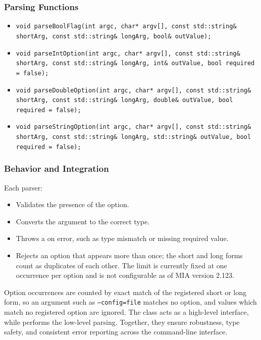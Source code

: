 \subsubsection{Parsing Functions}
\begin{itemize}\itemsep0em
	\item \texttt{void parseBoolFlag(int argc, char* argv[], const std::string\& shortArg, const std::string\& longArg, bool\& outValue);}
	\item \texttt{void parseIntOption(int argc, char* argv[], const std::string\& shortArg, const std::string\& longArg, int\& outValue, bool required = false);}
	\item \texttt{void parseDoubleOption(int argc, char* argv[], const std::string\& shortArg, const std::string\& longArg, double\& outValue, bool required = false);}
	\item \texttt{void parseStringOption(int argc, char* argv[], const std::string\& shortArg, const std::string\& longArg, std::string\& outValue, bool required = false);}
\end{itemize}

\subsubsection{Behavior and Integration}
Each parser:
\begin{itemize}\itemsep0em
	\item Validates the presence of the option.
	\item Converts the argument to the correct type.
	\item Throws a  on error, such as type mismatch or missing required value.
	\item Rejects an option that appears more than once; the short and long forms count as duplicates of each other. The limit is currently fixed at one occurrence per option and is not configurable as of MIA version 2.123.
\end{itemize}
Option occurrences are counted by exact match of the registered short or long form, so an argument such as \texttt{--config=file} matches no option, and values which match no registered option are ignored.
The  class acts as a high-level interface, while  performs the low-level parsing. Together, they ensure robustness, type safety, and consistent error reporting across the command-line interface.














